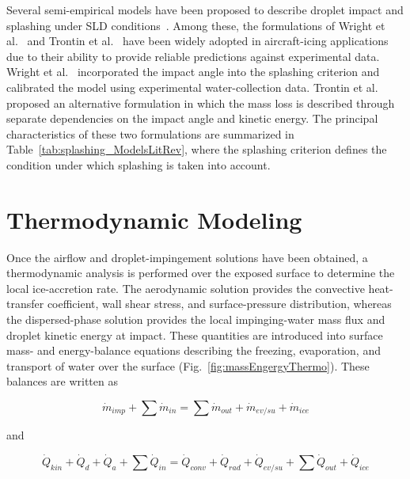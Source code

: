 Several semi-empirical models have been proposed to describe droplet impact and splashing under SLD conditions~\cite{mundo1998modeling,trujillo2000modelling,honsek2006fensap}. Among these, the formulations of Wright et al.~\cite{wright2004semi} and Trontin et al.~\cite{trontin2016revisited} have been widely adopted in aircraft-icing applications due to their ability to provide reliable predictions against experimental data. Wright et al.~\cite{wright2004semi} incorporated the impact angle into the splashing criterion and calibrated the model using experimental water-collection data. Trontin et al.~\cite{trontin2016revisited} proposed an alternative formulation in which the mass loss is described through separate dependencies on the impact angle and kinetic energy. The principal characteristics of these two formulations are summarized in Table~\ref{tab:splashing_ModelsLitRev}, where the splashing criterion defines the condition under which splashing is taken into account.



\section{Thermodynamic Modeling}\label{sec:review_thermodynamics}

Once the airflow and droplet-impingement solutions have been obtained, a thermodynamic analysis is performed over the exposed surface to determine the local ice-accretion rate. The aerodynamic solution provides the convective heat-transfer coefficient, wall shear stress, and surface-pressure distribution, whereas the dispersed-phase solution provides the local impinging-water mass flux and droplet kinetic energy at impact. These quantities are introduced into surface mass- and energy-balance equations describing the freezing, evaporation, and transport of water over the surface (Fig.~\ref{fig:massEngergyThermo}). These balances are written as

\begin{equation}
    \dot{m}_{imp}
    + \sum \dot{m}_{in}
    =
    \sum \dot{m}_{out}
    + \dot{m}_{ev/su}
    + \dot{m}_{ice}
    \label{eq:mass_balance}
\end{equation}

and

\begin{equation}
    \dot{Q}_{kin}
    + \dot{Q}_{d}
    + \dot{Q}_{a}
    + \sum \dot{Q}_{in}
    =
    \dot{Q}_{conv}
    + \dot{Q}_{rad}
    + \dot{Q}_{ev/su}
    + \sum \dot{Q}_{out}
    + \dot{Q}_{ice}
    \label{eq:energy_balance}
\end{equation}

